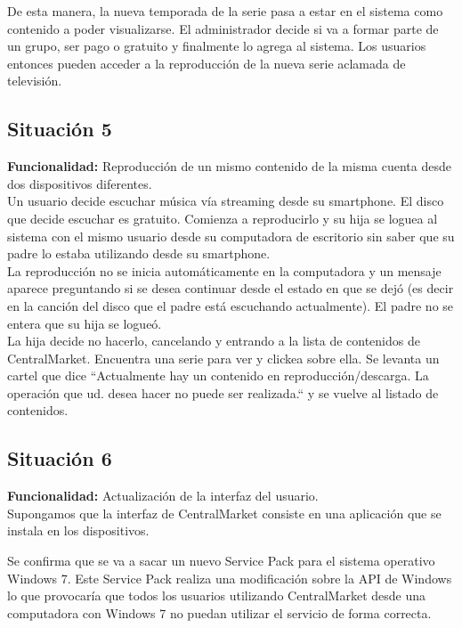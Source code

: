\documentclass[11pt, a4paper, spanish]{article}
\begin{document}
      De esta manera, la nueva temporada de la serie pasa a estar en el sistema como contenido a poder visualizarse. El administrador decide si va a    
   formar parte de un grupo, ser pago o gratuito y finalmente lo agrega al sistema.
   Los usuarios entonces pueden acceder a la reproducci\'on de la nueva serie aclamada de televisi\'on.

\subsection{Situaci\'on 5}

	\textbf{Funcionalidad:} Reproducci\'on de un mismo contenido de la misma cuenta desde dos dispositivos diferentes.\\

      Un usuario decide escuchar m\'usica v\'ia streaming desde su smartphone. El disco que decide escuchar es gratuito. Comienza a reproducirlo y su hija 
   se loguea al sistema con el mismo usuario desde su computadora de escritorio sin saber que su padre lo estaba utilizando desde su smartphone.\\

      La reproducci\'on no se inicia autom\'aticamente en la computadora y un mensaje aparece preguntando si se desea continuar desde el estado en que se   
   dej\'o (es decir en la canci\'on del disco que el padre est\'a escuchando actualmente). El padre no se entera que su hija se logue\'o.\\

      La hija decide no hacerlo, cancelando y entrando a la lista de contenidos de CentralMarket. Encuentra una serie para ver y clickea sobre ella. Se 
   levanta un cartel que dice ``Actualmente hay un contenido en reproducci\'on/descarga. La operaci\'on que ud. desea hacer no puede ser realizada.`` 	  y se vuelve al listado de contenidos.

\subsection{Situaci\'on 6}

	\textbf{Funcionalidad:} Actualizaci\'on de la interfaz del usuario.\\

	Supongamos que la interfaz de CentralMarket consiste en una aplicaci\'on que se instala en los dispositivos.

	Se confirma que se va a sacar un nuevo Service Pack para el sistema operativo Windows 7. Este Service Pack realiza una modificaci\'on sobre la   
   API de Windows lo que provocar\'ia que todos los usuarios utilizando CentralMarket desde una computadora con Windows 7 no puedan utilizar el servicio 
   de forma correcta.\\
\end{document}

